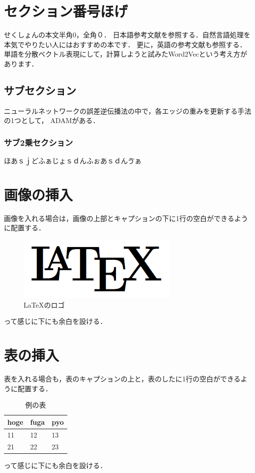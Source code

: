 \documentclass[10pt, a4j, uplatex, twocolumn]{jsarticle}
\begin{document}


\section{セクション番号ほげ}
せくしょんの本文半角0，全角０．
日本語参考文献を参照する．自然言語処理を本気でやりたい人にはおすすめの本\cite{Natural_Language_Processing_by_Deep_Learning}です．
更に，英語の参考文献も参照する．単語を分散ベクトル表現にして，計算しようと試みたWord2Vecという考え方\cite{Mikolov_word2vec}があります．
\subsection{サブセクション}
ニューラルネットワークの誤差逆伝播法の中で，各エッジの重みを更新する手法の1つとして，
ADAM\cite{ADAM}がある．

\subsubsection{サブ2乗セクション}
ほあｓｊどふぁじょｓｄんふぉあｓｄんゔぁ

\section{画像の挿入}
画像を入れる場合は，画像の上部とキャプションの下に1行の空白ができるように配置する．
\begin{figure}[H]
    \centering
    \includegraphics[width=0.8\linewidth]{latex-logo.png}
    \caption{LaTeXのロゴ}
    \label{fig:latex}
\end{figure}
って感じに下にも余白を設ける．
\section{表の挿入}
\lipsum[1]
表を入れる場合も，表のキャプションの上と，表のしたに1行の空白ができるように配置する．
\begin{table}[H]
\centering
\caption{例の表}
\label{tab:example}
\begin{tabular}{@{}lll@{}}
\toprule
hoge & fuga & pyo \\
\midrule
11   & 12   & 13  \\
21   & 22   & 23 \\
\bottomrule
\end{tabular}
\end{table}
って感じに下にも余白を設ける．
\end{document}
